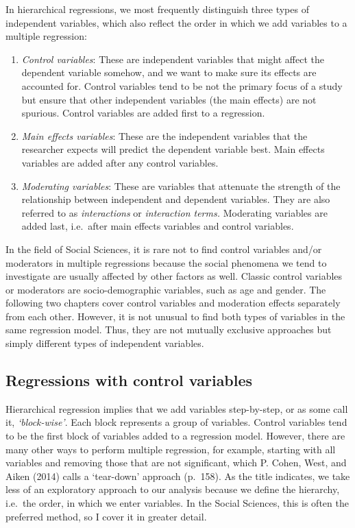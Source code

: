 \documentclass[
  letterpaper,
]{krantz}
\begin{document}
In hierarchical regressions, we most frequently distinguish three types
of independent variables, which also reflect the order in which we add
variables to a multiple regression:

\begin{enumerate}
\def\labelenumi{\arabic{enumi}.}
\item
  \emph{Control variables}: These are independent variables that might
  affect the dependent variable somehow, and we want to make sure its
  effects are accounted for. Control variables tend to be not the
  primary focus of a study but ensure that other independent variables
  (the main effects) are not spurious. Control variables are added first
  to a regression.
\item
  \emph{Main effects variables}: These are the independent variables
  that the researcher expects will predict the dependent variable best.
  Main effects variables are added after any control variables.
\item
  \emph{Moderating variables}: These are variables that attenuate the
  strength of the relationship between independent and dependent
  variables. They are also referred to as \emph{interactions} or
  \emph{interaction terms.} Moderating variables are added last,
  i.e.~after main effects variables and control variables.
\end{enumerate}

In the field of Social Sciences, it is rare not to find control
variables and/or moderators in multiple regressions because the social
phenomena we tend to investigate are usually affected by other factors
as well. Classic control variables or moderators are socio-demographic
variables, such as age and gender. The following two chapters cover
control variables and moderation effects separately from each other.
However, it is not unusual to find both types of variables in the same
regression model. Thus, they are not mutually exclusive approaches but
simply different types of independent variables.

\subsection{Regressions with control
variables}\label{sec-regressions-with-control-variables}

Hierarchical regression implies that we add variables step-by-step, or
as some call it, \emph{`block-wise'}. Each block represents a group of
variables. Control variables tend to be the first block of variables
added to a regression model. However, there are many other ways to
perform multiple regression, for example, starting with all variables
and removing those that are not significant, which P. Cohen, West, and
Aiken (2014) calls a `tear-down' approach (p.~158). As the title
indicates, we take less of an exploratory approach to our analysis
because we define the hierarchy, i.e.~the order, in which we enter
variables. In the Social Sciences, this is often the preferred method,
so I cover it in greater detail.
\end{document}
